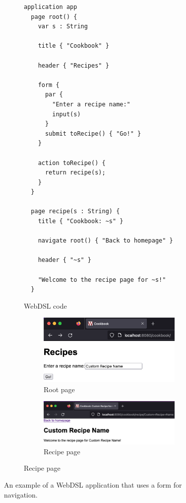       \begin{figure}
        \begin{subfigure}[t]{0.45\textwidth}
          \begin{verbatim}
application app
  page root() {
    var s : String

    title { "Cookbook" }

    header { "Recipes" }

    form {
      par {
        "Enter a recipe name:"
        input(s)
      }
      submit toRecipe() { "Go!" }
    }

    action toRecipe() {
      return recipe(s);
    }
  }

  page recipe(s : String) {
    title { "Cookbook: ~s" }

    navigate root() { "Back to homepage" }

    header { "~s" }

    "Welcome to the recipe page for ~s!"
  }
          \end{verbatim}
          \caption{\label{fig:webdsl-forms-webdsl}WebDSL code}
        \end{subfigure}
        \begin{subfigure}[t]{0.55\textwidth}
          \begin{subfigure}[t]{1\textwidth}
            \capstart
            \includegraphics[width=\textwidth]{../img/webdsl-forms-root}
            \caption{\label{fig:webdsl-forms-root-page}Root page}
          \end{subfigure}
          \begin{subfigure}[t]{1\textwidth}
            \capstart
            \includegraphics[width=\textwidth]{../img/webdsl-forms-recipe}
            \caption{\label{fig:webdsl-forms-recipe-page}Recipe page}
          \end{subfigure}
        \end{subfigure}
      \caption{\label{fig:webdsl-forms}An example of a WebDSL application that uses a form for navigation.}
      \end{figure}

